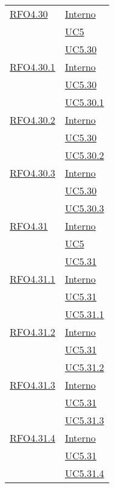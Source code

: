\begin{longtable}{|>{\centering}m{5cm}|m{5cm}<{\centering}|}
\hyperlink{RFO4.30}{RFO4.30} &\hyperlink{Interno}{Interno}\\ &\hyperref[UC5]{UC5}\\ &\hyperref[UC5.30]{UC5.30}\\ \hline

\hyperlink{RFO4.30.1}{RFO4.30.1} & \hyperlink{Interno}{Interno}\\ &\hyperref[UC5.30]{UC5.30}\\ &\hyperref[UC5.30.1]{UC5.30.1}\\ \hline

\hyperlink{RFO4.30.2}{RFO4.30.2} & \hyperlink{Interno}{Interno}\\ &\hyperref[UC5.30]{UC5.30}\\ &\hyperref[UC5.30.2]{UC5.30.2}\\ \hline

\hyperlink{RFO4.30.3}{RFO4.30.3} & \hyperlink{Interno}{Interno}\\ &\hyperref[UC5.30]{UC5.30}\\ &\hyperref[UC5.30.3]{UC5.30.3}\\ \hline

\hyperlink{RFO4.31}{RFO4.31} & \hyperlink{Interno}{Interno}\\ &\hyperref[UC5]{UC5}\\ &\hyperref[UC5.31]{UC5.31}\\ \hline

\hyperlink{RFO4.31.1}{RFO4.31.1} &  \hyperlink{Interno}{Interno}\\ &\hyperref[UC5.31]{UC5.31}\\ &\hyperref[UC5.31.1]{UC5.31.1}\\ \hline

\hyperlink{RFO4.31.2}{RFO4.31.2} &  \hyperlink{Interno}{Interno}\\ &\hyperref[UC5.31]{UC5.31}\\ &\hyperref[UC5.31.2]{UC5.31.2}\\ \hline

\hyperlink{RFO4.31.3}{RFO4.31.3} &  \hyperlink{Interno}{Interno}\\ &\hyperref[UC5.31]{UC5.31}\\ &\hyperref[UC5.31.3]{UC5.31.3}\\ \hline

\hyperlink{RFO4.31.4}{RFO4.31.4} & \hyperlink{Interno}{Interno}\\ &\hyperref[UC5.31]{UC5.31}\\ &\hyperref[UC5.31.4]{UC5.31.4}\\ \hline


\end{longtable}
